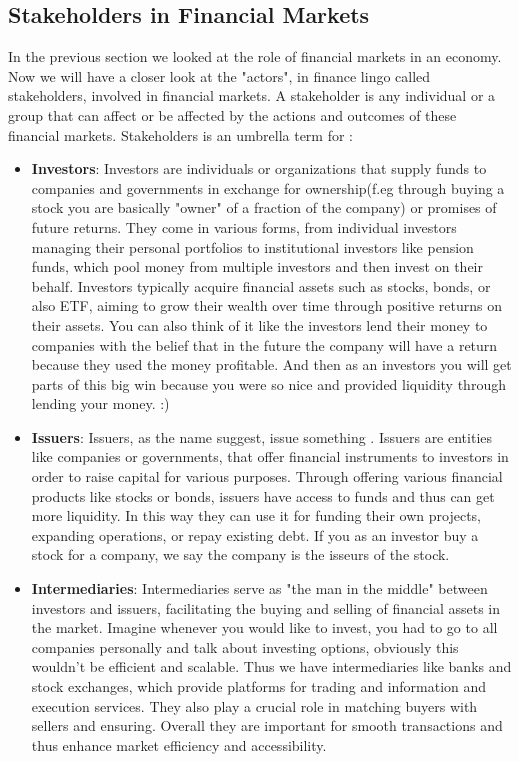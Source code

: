\documentclass{article}
\begin{document}
\subsection{Stakeholders in Financial Markets} 
In the previous section we looked at the role of financial markets in an economy. Now we will have a closer look at the "actors", in finance lingo called stakeholders, involved in financial markets. A stakeholder is any individual or a  group that can affect or be affected by the actions and outcomes of these financial markets. Stakeholders is an umbrella term for :

\begin{itemize}
\item \textbf{Investors}: Investors are individuals or organizations that supply funds to companies and governments in exchange for ownership(f.eg through buying a stock you are basically "owner" of a fraction of the company) or promises of future returns. They come in various forms, from individual investors managing their personal portfolios to institutional investors like pension funds, which pool money from multiple investors and then invest on their behalf. Investors typically acquire financial assets such as stocks, bonds, or also ETF, aiming to grow their wealth over time through positive returns on their assets. You can also think of it like the investors lend their money to companies with the belief that in the future the company will have a return because they used the money profitable. And then as an investors you will get parts of this big win because you were so nice and provided liquidity through lending your money. :)

\item \textbf{Issuers}: Issuers, as the name suggest, issue something . Issuers are entities like companies or  governments, that offer financial instruments to investors in order to raise capital for various purposes. Through offering various financial products like stocks or bonds, issuers have access to funds and thus can get more liquidity. In this way they can use it for funding their own projects, expanding operations, or repay existing debt. If you as an investor buy a stock for a company, we say the company is the isseurs of the stock.

\item \textbf{Intermediaries}: Intermediaries serve as "the man in the middle" between investors and issuers, facilitating the buying and selling of financial assets in the market. Imagine whenever you would like to invest, you had to go to all companies personally and talk about investing options, obviously this wouldn't be efficient and scalable. Thus we have intermediaries like  banks and stock exchanges, which provide platforms for trading and  information and execution services. They also play a crucial role in matching buyers with sellers and ensuring. Overall they are important for smooth transactions and thus enhance market efficiency and accessibility.


\end{itemize}
\end{document}
